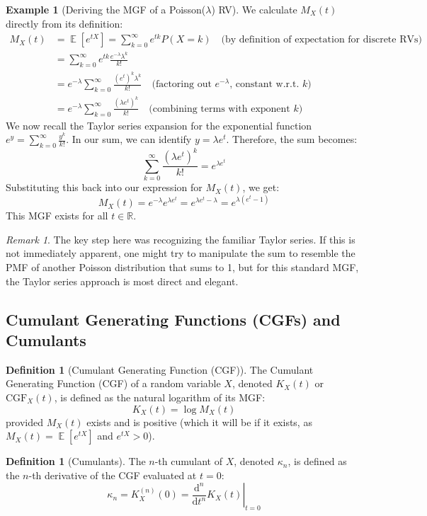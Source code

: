 \documentclass[11pt, letterpaper]{article}
\theoremstyle{plain} %
\theoremstyle{definition} %
\newtheorem{definition}[theorem]{Definition}
\newtheorem{example}[theorem]{Example}
\theoremstyle{remark} %
\newtheorem{remark}[theorem]{Remark}
\DeclareMathOperator{\E}{\mathbb{E}}
\newcommand{\R}{\mathbb{R}}
\newcommand{\dee}{\mathrm{d}} %
\newcommand{\CGF}{\mathrm{CGF}} %
\begin{document}
\begin{example}[Deriving the MGF of a Poisson($\lambda$) RV]
\label{ex:mgf_poisson}
We calculate $M_X(t)$ directly from its definition:
\begin{align*}
M_X(t) &= \E[e^{tX}] = \sum_{k=0}^{\infty} e^{tk} P(X=k) \quad \text{(by definition of expectation for discrete RVs)} \\
&= \sum_{k=0}^{\infty} e^{tk} \frac{e^{-\lambda}\lambda^k}{k!} \\
&= e^{-\lambda} \sum_{k=0}^{\infty} \frac{(e^t)^k \lambda^k}{k!} \quad \text{(factoring out } e^{-\lambda} \text{, constant w.r.t. } k \text{)} \\
&= e^{-\lambda} \sum_{k=0}^{\infty} \frac{(\lambda e^t)^k}{k!} \quad \text{(combining terms with exponent } k \text{)}
\end{align*}
We now recall the Taylor series expansion for the exponential function $e^y = \sum_{k=0}^{\infty} \frac{y^k}{k!}$.
In our sum, we can identify $y = \lambda e^t$.
Therefore, the sum becomes:
\[ \sum_{k=0}^{\infty} \frac{(\lambda e^t)^k}{k!} = e^{\lambda e^t} \]
Substituting this back into our expression for $M_X(t)$, we get:
\[ M_X(t) = e^{-\lambda} e^{\lambda e^t} = e^{\lambda e^t - \lambda} = e^{\lambda(e^t-1)} \]
This MGF exists for all $t \in \R$.
\begin{remark}
    The key step here was recognizing the familiar Taylor series. If this is not immediately apparent, one might try to manipulate the sum to resemble the PMF of another Poisson distribution that sums to 1, but for this standard MGF, the Taylor series approach is most direct and elegant.
\end{remark}
\end{example}

\subsection{Cumulant Generating Functions (CGFs) and Cumulants}
\label{subsec:cgf_cumulants}

\begin{definition}[Cumulant Generating Function (CGF)]
The Cumulant Generating Function (CGF) of a random variable $X$, denoted $K_X(t)$ or $\CGF_X(t)$, is defined as the natural logarithm of its MGF:
\[ K_X(t) = \log M_X(t) \]
provided $M_X(t)$ exists and is positive (which it will be if it exists, as $M_X(t)=\E[e^{tX}]$ and $e^{tX}>0$).
\end{definition}

\begin{definition}[Cumulants]
The $n$-th cumulant of $X$, denoted $\kappa_n$, is defined as the $n$-th derivative of the CGF evaluated at $t=0$:
\[ \kappa_n = K_X^{(n)}(0) = \left. \frac{\dee^n}{\dee t^n} K_X(t) \right|_{t=0} \]
\end{definition}
\end{document}
